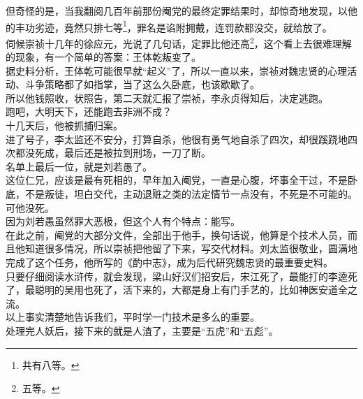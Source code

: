 \begin{multicols}{\theparacolNo}
但奇怪的是，当我翻阅几百年前那份阉党的最终定罪结果时，却惊奇地发现，以他的丰功劣迹，竟然只排七等\footnote{共有八等。}，罪名是谄附拥戴，连罚款都没交，就给放了。\\

伺候崇祯十几年的徐应元，光说了几句话，定罪比他还高\footnote{五等。}，这个看上去很难理解的现象，有一个简单的答案：王体乾叛变了。\\

据史料分析，王体乾可能很早就“起义”了，所以一直以来，崇祯对魏忠贤的心理活动、斗争策略都了如指掌，当了这么久卧底，也该歇歇了。\\

所以他钱照收，状照告，第二天就汇报了崇祯，李永贞得知后，决定逃跑。\\

跑吧，大明天下，还能跑去非洲不成？\\

十几天后，他被抓捕归案。\\

进了号子，李太监还不安分，打算自杀，他很有勇气地自杀了四次，却很蹊跷地四次都没死成，最后还是被拉到刑场，一刀了断。\\

名单上最后一位，就是刘若愚了。\\

这位仁兄，应该是最有死相的，早年加入阉党，一直是心腹，坏事全干过，不是卧底，不是叛徒，坦白交代，主动退赃之类的法定情节一点没有，不死是不可能的。\\

可他没死。\\

因为刘若愚虽然罪大恶极，但这个人有个特点：能写。\\

在此之前，阉党的大部分文件，全部出于他手，换句话说，他算是个技术人员，而且他知道很多情况，所以崇祯把他留了下来，写交代材料。刘太监很敬业，圆满地完成了这个任务，他所写的《酌中志》，成为后代研究魏忠贤的最重要史料。\\

只要仔细阅读水浒传，就会发现，梁山好汉们招安后，宋江死了，最能打的李逵死了，最聪明的吴用也死了，活下来的，大都是身上有门手艺的，比如神医安道全之流。\\

以上事实清楚地告诉我们，平时学一门技术是多么的重要。\\

处理完人妖后，接下来的就是人渣了，主要是“五虎”和“五彪”。\\


\end{multicols}
